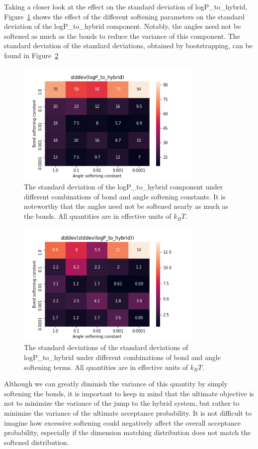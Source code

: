 %
Taking a closer look at the effect on the standard deviation of logP\_to\_hybrid, Figure~\ref{fig:angle_bond_softening} shows the effect of the different softening parameters on the standard deviation of the logP\_to\_hybrid component. Notably, the angles need not be softened as much as the bonds to reduce the variance of this component. The standard deviation of the standard deviations, obtained by bootstrapping, can be found in Figure~\ref{fig:stdstd}
%
\begin{figure}
    \centering
    \includegraphics[width=0.8\textwidth]{std_nostd_to_hybrid.png}
    \caption{The standard deviation of the logP\_to\_hybrid component under different combinations of bond and angle softening constants. 
    It is noteworthy that the angles need not be softened nearly as much as the bonds.
    All quantities are in effective units of $k_B T$.
    }
    \label{fig:angle_bond_softening}
\end{figure}
%
\begin{figure}
    \centering
    \includegraphics[width=0.8\textwidth]{stddev_lp.png}
    \caption{The standard deviations of the standard deviations of logP\_to\_hybrid under different combinations of bond and angle softening terms.
    All quantities are in effective units of $k_B T$.
    }
    \label{fig:stdstd}
\end{figure}
%
Although we can greatly diminish the variance of this quantity by simply softening the bonds, it is important to keep in mind that the ultimate objective is not to minimize the variance of the jump to the hybrid system, but rather to minimize the variance of the ultimate acceptance probability.
%
It is not difficult to imagine how excessive softening could negatively affect the overall acceptance probability, especially if the dimension matching distribution does not match the softened distribution.
%
